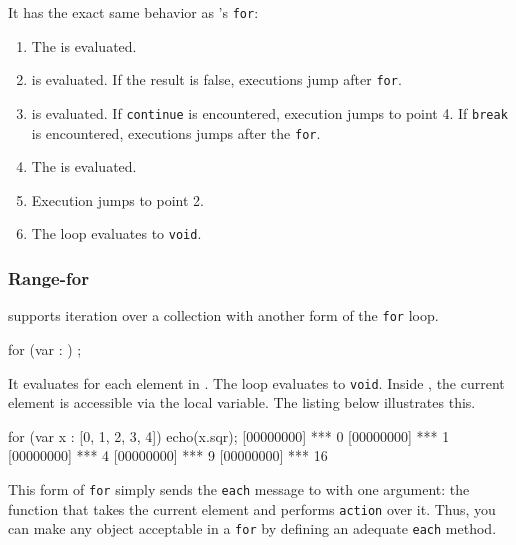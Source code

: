It has the exact same behavior as \C's \lstinline|for|:

\begin{enumerate}
\item The  is evaluated.
\item {} is evaluated. If the result is false, executions
  jump after \lstinline|for|.
\item {} is evaluated. If \lstinline|continue| is encountered,
  execution jumps to point 4. If \lstinline|break| is encountered,
  executions jumps after the \lstinline|for|.
\item The  is evaluated.
\item Execution jumps to point 2.
\item The loop evaluates to \lstinline|void|.
\end{enumerate}

\subsubsection{Range-for}
\label{sec:lang:for:each}

\us supports iteration over a collection with another form of the
\lstinline|for| loop.

\begin{urbiunchecked}
for (var  : )
   ;
\end{urbiunchecked}

It evaluates  for each element in . The loop
evaluates to \lstinline|void|.  Inside , the current element
is accessible via the  local variable. The listing below
illustrates this.

\begin{urbiscript}
for (var x : [0, 1, 2, 3, 4])
  echo(x.sqr);
[00000000] *** 0
[00000000] *** 1
[00000000] *** 4
[00000000] *** 9
[00000000] *** 16
\end{urbiscript}

This form of \lstinline|for| simply sends the \lstinline|each| message
to  with one argument: the function that takes the
current element and performs \lstinline|action| over it. Thus, you can
make any object acceptable in a \lstinline|for| by defining an
adequate \lstinline|each| method.


